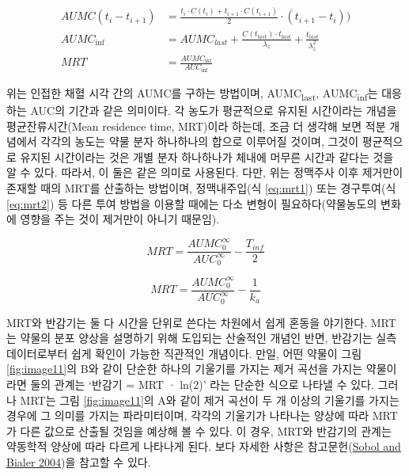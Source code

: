 \documentclass[
  11pt,
  krantz2, a4paper, twoside]{krantz}
\theoremstyle{definition}
\theoremstyle{definition}
\theoremstyle{definition}
\theoremstyle{definition}
\theoremstyle{remark}
\begin{document}
\begin{equation}
\begin{split}
  AUMC(t_i-t_{i+1}) &= \frac{t_i \cdot C(t_i) + t_{i+1} \cdot C(t_{i+1})}{2} \cdot (t_{i+1}-t_i)) \\
  AUMC_{\inf} &= AUMC_{last} + \frac{C(t_{last}) \cdot t_{last}}{\lambda_z} + \frac{t_{last}}{\lambda_z^2} \\
  MRT &= \frac{AUMC_{\inf}}{AUC_{\inf}}
\end{split}
\label{eq:mrteq}
\end{equation}

위는 인접한 채혈 시각 간의 AUMC를 구하는 방법이며, AUMC\textsubscript{last}, AUMC\textsubscript{inf}는 대응하는 AUC의 기간과 같은 의미이다.
각 농도가 평균적으로 유지된 시간이라는 개념을 평균잔류시간(Mean residence time, MRT)이라 하는데, 조금 더 생각해 보면 적분 개념에서 각각의 농도는 약물 분자 하나하나의 합으로 이루어질 것이며, 그것이 평균적으로 유지된 시간이라는 것은 개별 분자 하나하나가 체내에 머무른 시간과 같다는 것을 알 수 있다.
따라서, 이 둘은 같은 의미로 사용된다.
다만, 위는 정맥주사 이후 제거만이 존재할 때의 MRT를 산출하는 방법이며, 정맥내주입(식 \eqref{eq:mrt1}) 또는 경구투여(식 \eqref{eq:mrt2}) 등 다른 투여 방법을 이용할 때에는 다소 변형이 필요하다(약물농도의 변화에 영향을 주는 것이 제거만이 아니기 때문임).

\begin{equation}
MRT = \frac{AUMC_{0}^{\infty}}{AUC_{0}^{\infty}} - \frac{T_{inf}}{2}
\label{eq:mrt1}
\end{equation}

\begin{equation}
MRT = \frac{AUMC_{0}^{\infty}}{AUC_{0}^{\infty}} - \frac{1}{k_a}
\label{eq:mrt2}
\end{equation}

MRT와 반감기는 둘 다 시간을 단위로 쓴다는 차원에서 쉽게 혼동을 야기한다.
MRT는 약물의 분포 양상을 설명하기 위해 도입되는 산술적인 개념인 반면, 반감기는 실측데이터로부터 쉽게 확인이 가능한 직관적인 개념이다.
만일, 어떤 약물이 그림 \ref{fig:image11}의 B와 같이 단순한 하나의 기울기를 가지는 제거 곡선을 가지는 약물이라면 둘의 관계는 `반감기 = MRT · ln(2)' 라는 단순한 식으로 나타낼 수 있다.
그러나 MRT는 그림 \ref{fig:image11}의 A와 같이 제거 곡선이 두 개 이상의 기울기를 가지는 경우에 그 의미를 가지는 파라미터이며, 각각의 기울기가 나타나는 양상에 따라 MRT가 다른 값으로 산출될 것임을 예상해 볼 수 있다.
이 경우, MRT와 반감기의 관계는 약동학적 양상에 따라 다르게 나타나게 된다.
보다 자세한 사항은 참고문헌(\protect\hyperlink{ref-sobol2004relationships}{Sobol and Bialer 2004})을 참고할 수 있다.
\end{document}
